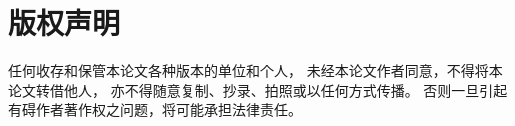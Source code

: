 %
%
%

\chapter*{版权声明}
\thispagestyle{empty}

任何收存和保管本论文各种版本的单位和个人，
未经本论文作者同意，不得将本论文转借他人，
亦不得随意复制、抄录、拍照或以任何方式传播。
否则一旦引起有碍作者著作权之问题，将可能承担法律责任。

